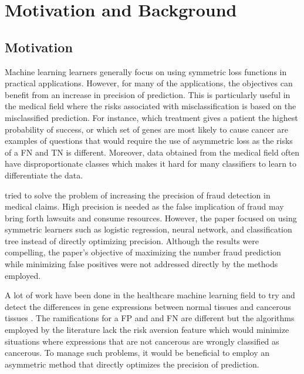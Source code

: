 \documentclass[twoside,11pt]{article}
\begin{document}
\section{Motivation and Background}
\subsection{Motivation}\label{motivation}
 Machine learning learners generally focus on using symmetric loss functions in practical applications. However, for many of the applications, the objectives can benefit from an increase in precision of prediction. This is particularly useful in the medical field where the risks associated with misclassification is based on the misclassified prediction. For instance, which treatment gives a patient the highest probability of success, or which set of genes are most likely to cause cancer are examples of questions that would require the use of asymmetric loss as the risks of a FN and TN is different. Moreover, data obtained from the medical field often have disproportionate classes which makes it hard for many classifiers to learn to differentiate the data. 

\citet{Liou08} tried to solve the problem of increasing the precision of fraud detection in medical claims. High precision is needed as the false implication of fraud may bring forth lawsuits and consume resources. However, the paper focused on using symmetric learners such as logistic regression, neural network, and classification tree instead of directly optimizing precision. Although the results were compelling, the paper's objective of maximizing the number fraud prediction while minimizing false positives were not addressed directly by the methods employed. 

A lot of work have been done in the healthcare machine learning field to try and detect the differences in gene expressions between normal tissues and cancerous tissues \citep{Ambroise02}\citep{Guyon02}. The ramifications for a FP and and FN are different but the algorithms employed by the literature lack the risk aversion feature which would minimize situations where expressions that are not cancerous are wrongly classified as cancerous. To manage such problems, it would be beneficial to employ an asymmetric method that directly optimizes the precision of prediction.
\end{document}
